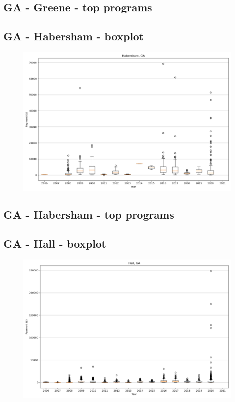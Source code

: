 \subsection*{GA - Greene - top programs}

\newpage
\subsection*{GA - Habersham - boxplot}
\begin{figure}[h]
\centering
\includegraphics[width=7in]{../output/boxplots/counties/Habersham-GA_boxplot.png}
\end{figure}


\subsection*{GA - Habersham - top programs}

\newpage
\subsection*{GA - Hall - boxplot}
\begin{figure}[h]
\centering
\includegraphics[width=7in]{../output/boxplots/counties/Hall-GA_boxplot.png}
\end{figure}


